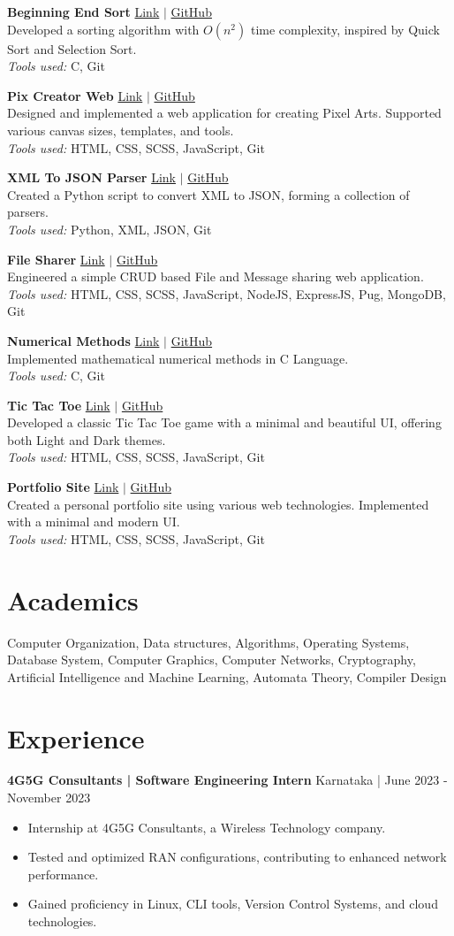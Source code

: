 \documentclass[a4paper,10pt]{article}
\newcommand{\projectentry}[5]{
  \noindent
  \textbf{#1} \hfill
  \href{#4}{Link} $|$ \href{#5}{GitHub} \\
  #2 \\
  \textit{Tools used:} #3
  \vspace{6pt} %
}
\begin{document}
\projectentry{Beginning End Sort}{
  Developed a sorting algorithm with $O(n^2)$ time complexity, inspired by Quick Sort and Selection Sort.
}{
  C, Git
}{https://github.com/surajkareppagol/BESort}{https://github.com/surajkareppagol/BESort}

\projectentry{Pix Creator Web}{
  Designed and implemented a web application for creating Pixel Arts. Supported various canvas sizes, templates, and tools.
}{
  HTML, CSS, SCSS, JavaScript, Git
}{https://surajkareppagol.github.io/pix-creator-web/}{https://github.com/surajkareppagol/Pix-Creator-Web}

\projectentry{XML To JSON Parser}{
  Created a Python script to convert XML to JSON, forming a collection of parsers.
}{
  Python, XML, JSON, Git
}{https://github.com/surajkareppagol/Parser}{https://github.com/surajkareppagol/Parser}

\projectentry{File Sharer}{
  Engineered a simple CRUD based File and Message sharing web application.
}{
  HTML, CSS, SCSS, JavaScript, NodeJS, ExpressJS, Pug, MongoDB, Git
}{https://github.com/surajkareppagol/FileSharer}{https://github.com/surajkareppagol/FileSharer}

\projectentry{Numerical Methods}{
  Implemented mathematical numerical methods in C Language.
}{
  C, Git
}{https://github.com/surajkareppagol/Numerical-Methods}{https://github.com/surajkareppagol/Numerical-Methods}

\projectentry{Tic Tac Toe}{
  Developed a classic Tic Tac Toe game with a minimal and beautiful UI, offering both Light and Dark themes.
}{
  HTML, CSS, SCSS, JavaScript, Git
}{https://surajkareppagol.github.io/Tic-Tac-Toe/}{https://github.com/surajkareppagol/Tic-Tac-Toe}

\projectentry{Portfolio Site}{
  Created a personal portfolio site using various web technologies. Implemented with a minimal and modern UI.
}{
  HTML, CSS, SCSS, JavaScript, Git
}{https://suraj-kareppagol.web.app/}{https://github.com/surajkareppagol/surajkareppagol.github.io}

\section*{Academics}
Computer Organization, Data structures, Algorithms, Operating Systems, Database System, Computer Graphics, Computer Networks, Cryptography, Artificial Intelligence and Machine Learning, Automata Theory, Compiler Design

\section*{Experience}
\noindent
\textbf{4G5G Consultants | Software Engineering Intern} \hfill Karnataka | June 2023 - November 2023
\begin{itemize}[left=0pt]
  \item Internship at 4G5G Consultants, a Wireless Technology company.
  \item Tested and optimized RAN configurations, contributing to enhanced network performance.
  \item Gained proficiency in Linux, CLI tools, Version Control Systems, and cloud technologies.
\end{itemize}
\end{document}
